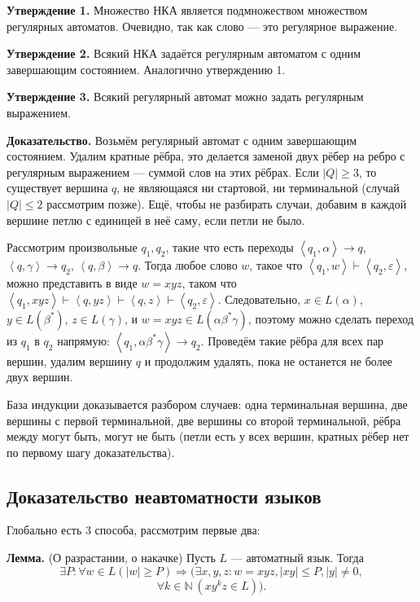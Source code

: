 \textbf{Утверждение 1.} Множество НКА является подмножеством множеством регулярных автоматов. Очевидно, так как слово --- это регулярное выражение.

\textbf{Утверждение 2.} Всякий НКА задаётся регулярным автоматом с одним завершающим состоянием. Аналогично утверждению 1.

\textbf{Утверждение 3.} Всякий регулярный автомат можно задать регулярным выражением.

\textbf{Доказательство.} Возьмём регулярный автомат с одним завершающим состоянием.
Удалим кратные рёбра, это делается заменой двух рёбер на ребро с регулярным выражением --- суммой слов на этих рёбрах.
Если $|Q| \ge 3$, то существует вершина $q$, не являющаяся ни стартовой, ни терминальной (случай $|Q| \le 2$ рассмотрим позже).
Ещё, чтобы не разбирать случаи, добавим в каждой вершине петлю с единицей в неё саму, если петли не было.

Рассмотрим произвольные $q_1, q_2$, такие что есть переходы $\left< q_1, \alpha \right> \to q$, $\left< q, \gamma \right> \to q_2$, $\left< q, \beta \right> \to q$.
Тогда любое слово $w$, такое что $\left<q_1, w \right> \vdash \left<q_2, \varepsilon \right>$, можно представить в виде $w = xyz$, таком что $\left< q_1, xyz \right> \vdash \left< q, yz \right> \vdash \left< q, z \right> \vdash \left< q_2, \varepsilon \right>$.
Следовательно, $x \in L(\alpha)$, $y \in L(\beta^*)$, $z \in L(\gamma)$, и $w = xyz \in L(\alpha \beta^* \gamma)$, поэтому можно сделать переход из $q_1$ в $q_2$ напрямую: $\left<q_1, \alpha \beta^* \gamma \right> \to q_2$.
Проведём такие рёбра для всех пар вершин, удалим вершину $q$ и продолжим удалять, пока не останется не более двух вершин.

База индукции доказывается разбором случаев: одна терминальная вершина, две вершины с первой терминальной, две вершины со второй терминальной, рёбра между могут быть, могут не быть (петли есть у всех вершин, кратных рёбер нет по первому шагу доказательства).

\QED

\subsection{Доказательство неавтоматности языков}
Глобально есть 3 способа, рассмотрим первые два:

\textbf{Лемма.} (О разрастании, о накачке) Пусть $L$ --- автоматный язык. Тогда
\[
    \exists P: \forall w \in L (|w| \ge P) \Rightarrow (\exists x, y, z: w = xyz, |xy| \le P, |y| \ne 0, 
\]
\[
    \forall k \in \mathbb N~(xy^kz \in L)).
\]

